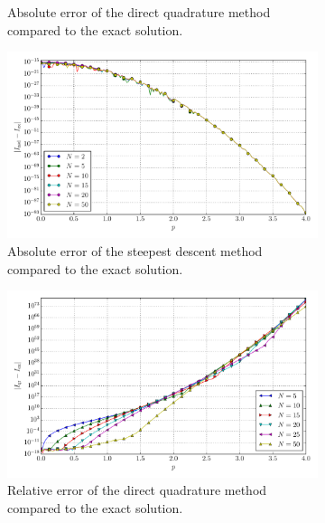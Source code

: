 \documentclass[a4paper,10pt]{article}
\begin{document}
\begin{figure}[ht!]
\begin{subfigure}[t]{0.5\linewidth}
    \caption{Absolute error of the direct quadrature method compared to the exact solution.}
    \label{fig:tp_2d_conv_p_00_00_err_qr}
  \end{subfigure}
  \begin{subfigure}[t]{0.5\linewidth}
    \includegraphics[width=\linewidth]{./plots/tp_2d_conv_p_(0,0)_(0,0)_err_nsd.pdf}
    \caption{Absolute error of the steepest descent method compared to the exact solution.}
    \label{fig:tp_2d_conv_p_00_00_err_nsd}
  \end{subfigure}
  \begin{subfigure}[t]{0.5\linewidth}
    \includegraphics[width=\linewidth]{./plots/tp_2d_conv_p_(0,0)_(0,0)_err_rel_qr.pdf}
    \caption{Relative error of the direct quadrature method compared to the exact solution.}
    \label{fig:tp_2d_conv_p_00_00_err_rel_qr}
  \end{subfigure}
  \begin{subfigure}[t]{0.5\linewidth}

\end{subfigure}
\end{figure}
\end{document}
